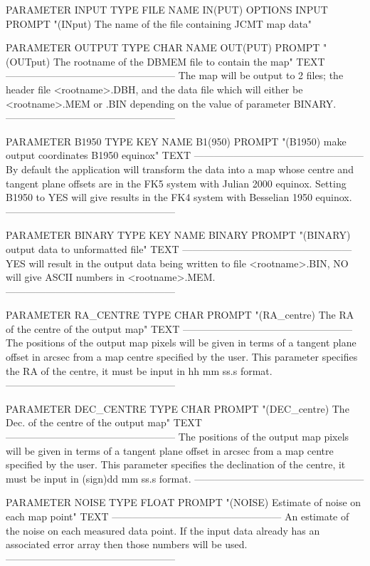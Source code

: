 \documentclass[twoside,11pt,nolof]{starlink}
\begin{document}
\begin{small}
\begin{terminalv}
PARAMETER  INPUT
  TYPE    FILE
  NAME    IN(PUT)
  OPTIONS INPUT
  PROMPT  "(INput) The name of the file containing JCMT map data"

PARAMETER  OUTPUT
  TYPE    CHAR
  NAME    OUT(PUT)
  PROMPT  "(OUTput) The rootname of the DBMEM file to contain the map"
  TEXT   ---------------------------------------------------
         The map will be output to 2 files; the header file
         <rootname>.DBH, and the data file which will
         either be <rootname>.MEM or .BIN depending on the
         value of parameter BINARY.
         ---------------------------------------------------

PARAMETER B1950
  TYPE    KEY
  NAME    B1(950)
  PROMPT "(B1950) make output coordinates B1950 equinox"
  TEXT   ---------------------------------------------------
         By default the application will transform the data
         into a map whose centre and tangent plane offsets
         are in the FK5 system with Julian 2000 equinox.
         Setting B1950 to YES will give results in the FK4
         system with Besselian 1950 equinox.
         ---------------------------------------------------

PARAMETER BINARY
  TYPE   KEY
  NAME   BINARY
  PROMPT "(BINARY) output data to unformatted file"
  TEXT   ---------------------------------------------------
         YES will result in the output data being written to
         file <rootname>.BIN, NO will give ASCII numbers in
         <rootname>.MEM.
         ---------------------------------------------------

PARAMETER RA_CENTRE
  TYPE   CHAR
  PROMPT "(RA_centre) The RA of the centre of the output map"
  TEXT   ---------------------------------------------------
         The positions of the output map pixels will be
         given in terms of a tangent plane offset in arcsec
         from a map centre specified by the user. This parameter
         specifies the RA of the centre, it must be input in
         hh mm ss.s format.
         ---------------------------------------------------

PARAMETER DEC_CENTRE
  TYPE   CHAR
  PROMPT "(DEC_centre) The Dec. of the centre of the output map"
  TEXT   ---------------------------------------------------
         The positions of the output map pixels will be
         given in terms of a tangent plane offset in arcsec
         from a map centre specified by the user. This parameter
         specifies the declination of the centre, it must be
         input in (sign)dd mm ss.s format.
         ---------------------------------------------------

PARAMETER NOISE
  TYPE   FLOAT
  PROMPT "(NOISE) Estimate of noise on each map point"
  TEXT   ---------------------------------------------------
         An estimate of the noise on each measured data point.
         If the input data already has an associated error
         array then those numbers will be used.
         ---------------------------------------------------
\end{terminalv}
\end{small}
\end{document}
